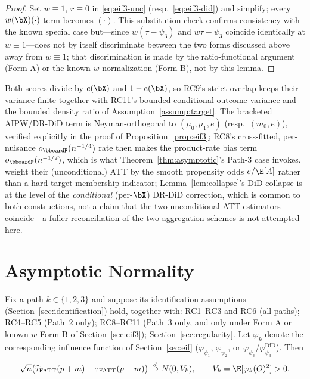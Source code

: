\documentclass{article}
\renewcommand{\P}{\bboardP}
\begin{document}
\begin{proof}
Set $w\equiv1$, $r\equiv0$ in \eqref{eq:eif3-unc} (resp.\ \eqref{eq:eif3-did}) and simplify; every $w(\bX)(\cdot)$ term becomes $(\cdot)$. This substitution check confirms consistency with the known special case but---since $w(\tau-\psi_3)$ and $w\tau-\psi_3$ coincide identically at $w\equiv1$---does not by itself discriminate between the two forms discussed above away from $w\equiv1$; that discrimination is made by the ratio-functional argument (Form A) or the known-$w$ normalization (Form B), not by this lemma.
\end{proof}

\begin{remark}
\label{rem:path3-overlap}
Both scores divide by $e(\bX)$ and $1-e(\bX)$, so RC9's strict overlap keeps their variance finite together with RC11's bounded conditional outcome variance and the bounded density ratio of Assumption~\ref{assump:target}. The bracketed AIPW/DR-DiD term is Neyman-orthogonal to $(\mu_0,\mu_1,e)$ (resp.\ $(m_0,e)$), verified explicitly in the proof of Proposition~\ref{prop:eif3}; RC8's cross-fitted, per-nuisance $o_\P(n^{-1/4})$ rate then makes the product-rate bias term $o_\P(n^{-1/2})$, which is what Theorem~\ref{thm:asymptotic}'s Path-3 case invokes. \citet{santannaDoublyRobustDifferenceindifferences2020} weight their (unconditional) ATT by the smooth propensity odds $e/\E[A]$ rather than a hard target-membership indicator; Lemma~\ref{lem:collapse}'s DiD collapse is at the level of the \emph{conditional} (per-$\bX$) DR-DiD correction, which is common to both constructions, not a claim that the two unconditional ATT estimators coincide---a fuller reconciliation of the two aggregation schemes is not attempted here.
\end{remark}

\section{Asymptotic Normality}
\label{sec:asymptotics}

\begin{theorem}
\label{thm:asymptotic}
Fix a path $k\in\{1,2,3\}$ and suppose its identification assumptions (Section~\ref{sec:identification}) hold, together with: RC1--RC3 and RC6 (all paths); RC4--RC5 (Path~2 only); RC8--RC11 (Path~3 only, and only under Form A or known-$w$ Form B of Section~\ref{sec:eif3}); Section~\ref{sec:regularity}. Let $\varphi_k$ denote the corresponding influence function of Section~\ref{sec:eif} ($\varphi_{\psi_1}$, $\varphi_{\psi_2}$, or $\varphi_{\psi_3}$/$\varphi_{\psi_3}^{\mathrm{DiD}}$). Then
\[
\sqrt n\bigl(\widehat\tau_{\mathrm{FATT}}(p+m) - \tau_{\mathrm{FATT}}(p+m)\bigr) \overset{d}{\to} N(0, V_k), \qquad V_k = \E[\varphi_k(O)^2] > 0.
\]
\end{theorem}
\end{document}
